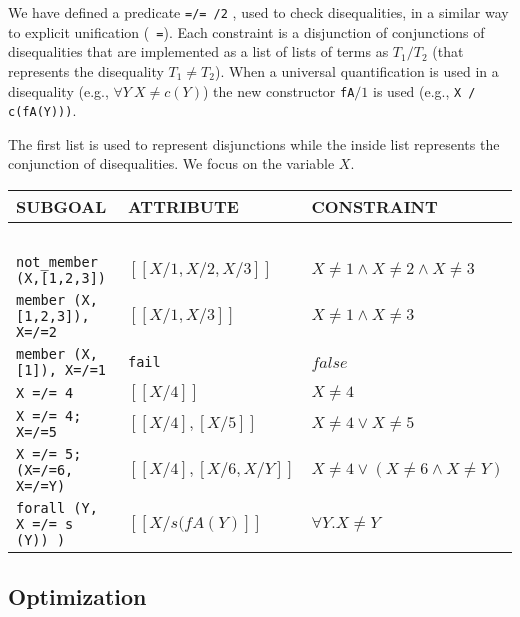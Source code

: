 \documentclass{llncs}
\begin{document}
We have defined a predicate {\tt =/= /2} \cite{SusanaPADL2000}, used
to check disequalities, in a similar way to explicit unification ({\tt
  =}). Each constraint is a disjunction of conjunctions of
disequalities that are implemented as a list of lists of terms as
$T_1/T_2$ (that represents the disequality $T_1 \neq T_2$). When a
universal quantification is used in a disequality (e.g., $\forall Y~ X
\neq c(Y)$) the new constructor {\tt fA}$/1$ is used (e.g., {\tt X /
  c(fA(Y)))}.

The first list is used to represent disjunctions while
the inside list represents the conjunction of disequalities.
We focus on the variable $X$.

\begin{center}
\begin{small}
\begin{tabular}{lll}
SUBGOAL & ATTRIBUTE & CONSTRAINT \\
\hline\hline
\ \\
{\tt not\_member (X,[1,2,3])}   &  $[[X/1,X/2,X/3]]$  & $X \neq 1 \wedge X \neq 2 \wedge X \neq 3$\\
{\tt member (X,[1,2,3]), X=/=2} &  $[[X/1,X/3]]$       & $X \neq 1 \wedge X \neq 3$\\
{\tt member (X,[1]), X=/=1}     &  {\tt fail}          & $false$ \\
{\tt X =/= 4}                   & $[[X/4]]$            & $X \neq 4$ \\
{\tt X =/= 4; X=/=5}            & $[[X/4], [X/5]]$     & $X \neq 4 \vee X \neq 5$ \\
{\tt X =/= 5; (X=/=6, X=/=Y)}   & $[[X/4],[X/6, X/Y]]$ & $X \neq 4 \vee (X \neq 6 \wedge X \neq Y)$\\
{\tt forall (Y, X =/= s (Y)) )}     & $[[X/s(fA(Y)]]$  & $\forall Y. X \neq Y$ \\
\end{tabular}
\end{small}
\end{center}




\subsection{Optimization}
\label{optimization}
\end{document}
